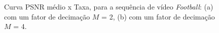 \begin{figure}[H]
	
	\centering
	\caption{Curva PSNR médio x Taxa, para a sequência de vídeo \textit{Football}: (a) com um fator de decimação $M$ = 2, (b) com um fator de decimação $M$ = 4.}
	\label{fig:football}
\end{figure}


